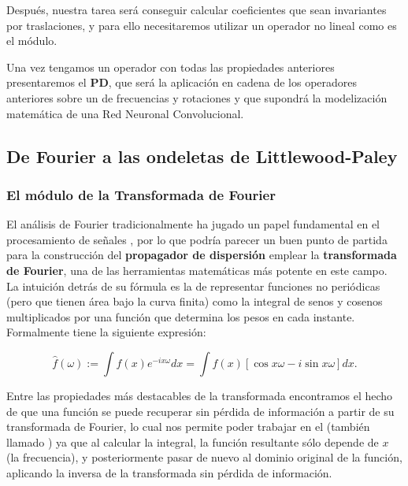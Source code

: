 \medskip

\noindent Después, nuestra tarea será conseguir calcular coeficientes que sean invariantes por traslaciones, y para ello necesitaremos utilizar un operador no lineal como es el módulo. 

\medskip

\noindent Una vez tengamos un operador con todas las propiedades anteriores presentaremos el \textbf{PD}, que será la aplicación en cadena de los operadores anteriores sobre un  de frecuencias y rotaciones y que supondrá la modelización matemática de una Red Neuronal Convolucional.



\subsection{De Fourier a las ondeletas de Littlewood-Paley}

\subsubsection{El módulo de la Transformada de Fourier}

\noindent El análisis de Fourier tradicionalmente ha jugado un papel fundamental en el procesamiento de señales \cite{DigitalImageProcessing}, por lo que podría parecer un buen punto de partida para la construcción del \textbf{propagador de dispersión} emplear la \textbf{transformada de Fourier}, una de las herramientas matemáticas más potente en este campo. La intuición detrás de su fórmula es la de representar funciones no periódicas (pero que tienen área bajo la curva finita) como la integral de senos y cosenos multiplicados por una función que determina los pesos en cada instante. Formalmente tiene la siguiente expresión:

$$\widehat{f}(\omega):= \int{f(x)e^{-ix\omega}dx}=\int{f(x)\left[\cos{x\omega} -i\sin{x\omega}\right]dx}.$$

\noindent Entre las propiedades más destacables de la transformada encontramos el hecho de que una función se puede recuperar sin pérdida de información a partir de su transformada de Fourier, lo cual nos permite poder trabajar en el  (también llamado ) ya que al calcular la integral, la función resultante sólo depende de $x$ (la frecuencia), y posteriormente pasar de nuevo al dominio original de la función, aplicando la inversa de la transformada sin pérdida de información.

